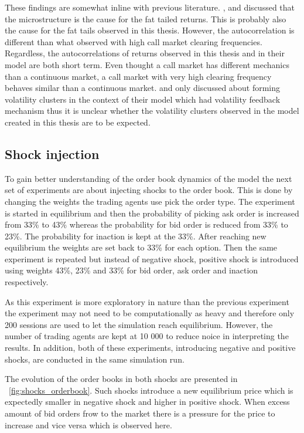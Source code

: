 These findings are somewhat inline with previous literature. \citet{Genoa01}, \citet{Raberto05} and \citet{LIU20082535} 
discussed that the microstructure is the cause for the fat tailed returns. This is probably also the cause for the
fat tails observed in this thesis. However, the autocorrelation is different than what \citet{LIU20082535} observed
with high call market clearing frequencies. Regardless, the autocorrelations of returns observed in this thesis and in their model
are both short term. Even thought a call market has different mechanics than a continuous market, a call market with
very high clearing frequency behaves similar than a continuous market. \citet{Genoa01} and \citet{Raberto05} only discussed
about forming volatility clusters in the context of their model which had volatility feedback mechanism thus it is unclear
whether the volatility clusters observed in the model created in this thesis are to be expected.

\subsection{Shock injection}

To gain better understanding of the order book dynamics of the model the next set of experiments are about injecting shocks 
to the order book. This is done by changing the weights the trading agents use pick the order type. The experiment is started
in equilibrium and then the probability of picking ask order is increased from 33\% to 43\% whereas the probability for bid
order is reduced from 33\% to 23\%. The probability for inaction is kept at the 33\%. After reaching new equilibrium the 
weights are set back to 33\% for each option. Then the same experiment is repeated but instead of negative shock, positive 
shock is introduced using weights 43\%, 23\% and 33\% for bid order, ask order and inaction respectively. 

As this experiment is more exploratory in nature than the previous experiment the experiment may not need to be computationally
as heavy and therefore only 200 sessions are used to let the simulation reach equilibrium. However, the number of trading agents
are kept at 10 000 to reduce noice in interpreting the results. In addition, both of these experiments, introducing negative and 
positive shocks, are conducted in the same simulation run.

The evolution of the order books in both shocks are presented in ~\ref{fig:shocks_orderbook}. Such shocks introduce a new equilibrium
price which is expectedly smaller in negative shock and higher in positive shock. When excess amount of bid orders frow to the market
there is a pressure for the price to increase and vice versa which is observed here. 

